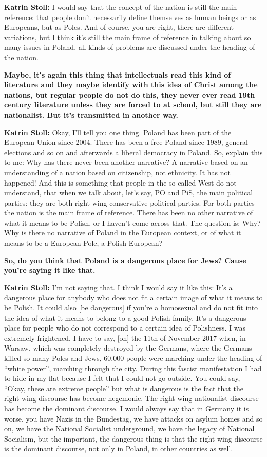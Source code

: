\textbf{Katrin Stoll:}  I would say that the concept of the nation is still the main reference: that people don’t necessarily define themselves as human beings or as Europeans, but as Poles. And of course, you are right, there are different variations, but I think it’s still the main frame of reference in talking about so many issues in Poland, all kinds of problems are discussed under the heading of the nation. 

\textbf{Maybe, it’s again this thing that intellectuals read this kind of literature and they maybe identify with this idea of Christ among the nations, but regular people do not do this, they never ever read 19th century literature unless they are forced to at school, but still they are nationalist. But it’s transmitted in another way.} 

\textbf{Katrin Stoll:} Okay, I’ll tell you one thing. Poland has been part of the European Union since 2004. There has been a free Poland since 1989, general elections and so on and afterwards a liberal democracy in Poland. So, explain this to me: Why has there never been another narrative? A narrative based on an understanding of a nation based on citizenship, not ethnicity. It has not happened! And this is something that people in the so-called West do not understand, that when we talk about, let’s say, PO and PiS, the main political parties: they are both right-wing conservative political parties. For both parties the nation is the main frame of reference. There has been no other narrative of what it means to be Polish, or I haven’t come across that. The question is: Why? Why is there no narrative of Poland in the European context, or of what it means to be a European Pole, a Polish European? 

\textbf{So, do you think that Poland is a dangerous place for Jews? Cause you’re saying it like that.}  
 
\textbf{Katrin Stoll:} I’m not saying that. I think I would say it like this: It’s a dangerous place for anybody who does not fit a certain image of what it means to be Polish. It could also [be dangerous] if you’re a homosexual and do not fit into the idea of what it means to belong to a good Polish family. It’s a dangerous place for people who do not correspond to a certain idea of Polishness. I was extremely frightened, I have to say, [on] the 11th of November 2017 when, in Warsaw, which was completely destroyed by the Germans, where the Germans killed so many Poles and Jews, 60,000 people were marching under the heading of "`white power"', marching through the city. During this fascist manifestation I had to hide in my flat because I felt that I could not go outside. You could say, "`Okay, these are extreme people"' but what is dangerous is the fact that the right-wing discourse has become hegemonic. The right-wing nationalist discourse has become the dominant discourse. I would always say that in Germany it is worse, you have Nazis in the Bundestag, we have attacks on asylum homes and so on, we have the National Socialist underground, we have the legacy of National Socialism, but the important, the dangerous thing is that the right-wing discourse is the dominant discourse, not only in Poland, in other countries as well.  

